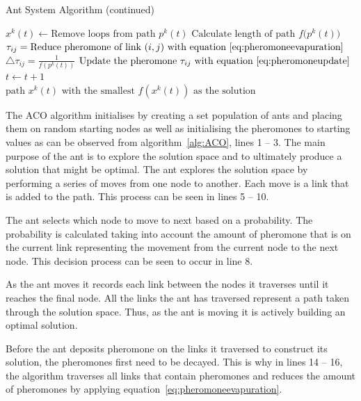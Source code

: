 \begin{algorithm}[H]
\caption{Ant System Algorithm (continued)}
\label{alg:ACO1}
	\begin{algorithmic}
			\State$x^k(t) \leftarrow \text{Remove loops from path }p^k(t)$
			\State$\text{Calculate length of path $f(p^k(t)$})$
		\EndFor
			\State$\tau_{ij} = \text{Reduce pheromone of link $(i,j)$ with equation~\ref{eq:pheromoneevapuration}}$
		\EndFor
				\State$\triangle \tau_{ij} = \frac{1}{f(p^k(t))}$
				\State$\text{Update the pheromone $\tau_{ij}$ with equation~\ref{eq:pheromoneupdate}}$
			\EndFor
		\EndFor
		\State$t \leftarrow t + 1$
	\EndWhile\\
	\Return $\text{path $x^k(t)$ with the smallest $f(x^k(t))$ as the solution}$
	\end{algorithmic}
\end{algorithm}

The \gls{ACO} algorithm initialises by creating a set population of ants and placing them on random starting nodes as well as initialising the pheromones to starting values as can be observed from algorithm~\ref{alg:ACO}, lines 1 -- 3. The main purpose of the ant is to explore the solution space and to ultimately produce a solution that might be optimal. The ant explores the solution space by performing a series of moves from one node to another. Each move is a link that is added to the path. This process can be seen in lines 5 -- 10.

The ant selects which node to move to next based on a probability. The probability is calculated taking into account the amount of pheromone that is on the current link representing the movement from the current node to the next node\cite{CompuIntelligenceIntro,FundamentalSwarm}. This decision process can be seen to occur in line 8.

As the ant moves it records each link between the nodes it traverses until it reaches the final node. All the links the ant has traversed represent a path taken through the solution space\cite{CompuIntelligenceIntro,FundamentalSwarm}. Thus, as the ant is moving it is actively building an optimal solution.

Before the ant deposits pheromone on the links it traversed to construct its solution, the pheromones first need to be decayed. This is why in lines 14 -- 16, the algorithm traverses all links that contain pheromones and reduces the amount of pheromones by applying equation~\ref{eq:pheromoneevapuration}.

